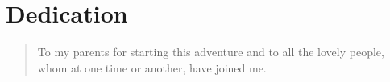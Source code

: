 \chapter*{Dedication}
\label{ch:list_of_appendices}
\begin{quote}
  To my parents for starting this adventure and to all the lovely people, whom at one time or another, have joined me.
\end{quote}
\vfill
